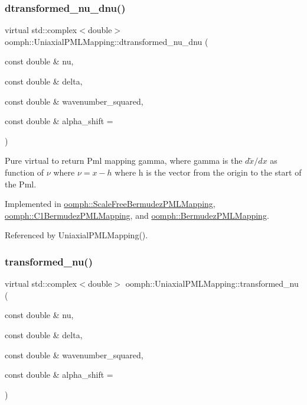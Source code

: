 \subsubsection{\texorpdfstring{dtransformed\+\_\+nu\+\_\+dnu()}{dtransformed\_nu\_dnu()}}
{\footnotesize\ttfamily virtual std\+::complex$<$double$>$ oomph\+::\+Uniaxial\+P\+M\+L\+Mapping\+::dtransformed\+\_\+nu\+\_\+dnu (\begin{DoxyParamCaption}\item[{const double \&}]{nu,  }\item[{const double \&}]{delta,  }\item[{const double \&}]{wavenumber\+\_\+squared,  }\item[{const double \&}]{alpha\+\_\+shift = {} }\end{DoxyParamCaption})\hspace{0.3cm}{\ttfamily [pure virtual]}}



Pure virtual to return Pml mapping gamma, where gamma is the $d\tilde x / d x$ as function of $\nu$ where $\nu = x - h$ where h is the vector from the origin to the start of the Pml. 



Implemented in \hyperlink{classoomph_1_1ScaleFreeBermudezPMLMapping_acb846023cc8a5c95b5ff807dfa404414}{oomph\+::\+Scale\+Free\+Bermudez\+P\+M\+L\+Mapping}, \hyperlink{classoomph_1_1C1BermudezPMLMapping_a6cd89443e778419f9f107971f5176607}{oomph\+::\+C1\+Bermudez\+P\+M\+L\+Mapping}, and \hyperlink{classoomph_1_1BermudezPMLMapping_adf727a41969fc98de8122c502d562c57}{oomph\+::\+Bermudez\+P\+M\+L\+Mapping}.



Referenced by Uniaxial\+P\+M\+L\+Mapping().

\mbox{\label{classoomph_1_1UniaxialPMLMapping_ae4a0c65e90fe4b90d2ff00b193798588}} 
\subsubsection{\texorpdfstring{transformed\+\_\+nu()}{transformed\_nu()}}
{\footnotesize\ttfamily virtual std\+::complex$<$double$>$ oomph\+::\+Uniaxial\+P\+M\+L\+Mapping\+::transformed\+\_\+nu (\begin{DoxyParamCaption}\item[{const double \&}]{nu,  }\item[{const double \&}]{delta,  }\item[{const double \&}]{wavenumber\+\_\+squared,  }\item[{const double \&}]{alpha\+\_\+shift = {} }\end{DoxyParamCaption})\hspace{0.3cm}{\ttfamily [pure virtual]}}



